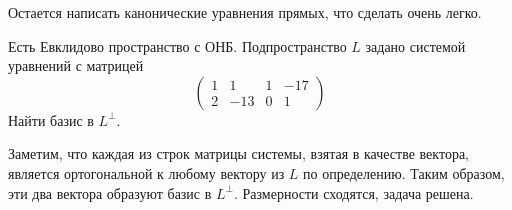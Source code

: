 Остается написать канонические уравнения прямых, что сделать очень легко.

\begin{task}
    Есть Евклидово пространство с ОНБ. Подпространство $L$ задано системой уравнений с матрицей
    \begin{equation*}
        \begin{pmatrix}
            1 & 1 & 1 & -17 \\ 2 & -13 & 0 & 1
        \end{pmatrix}
    \end{equation*}
    Найти базис в $L^{\perp}$.
\end{task}

Заметим, что каждая из строк матрицы системы, взятая в качестве вектора, является ортогональной к любому вектору из $L$ по определению. Таким образом, эти два вектора образуют базис в $L^{\perp}$. Размерности сходятся, задача решена.










